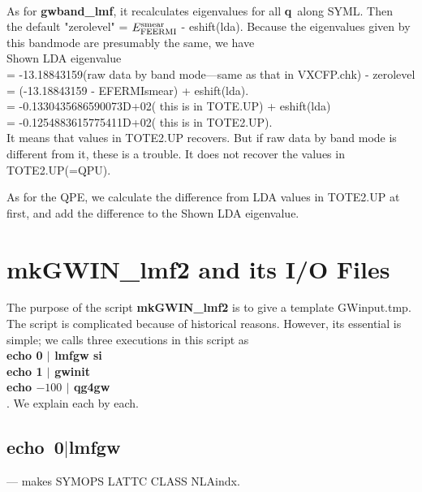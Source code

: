 \documentclass[a4paper,10pt,epsf,fleqn]{article}
\newcommand{\ssxx}[2]{\subsection{\bf #1\index{\bf #2}}}
\newcommand{\infiles}{\noindent\fbox{Input files}}
\newcommand{\bfq}{{\bf q}}
\newcommand{\exe}[1]{{\bf #1}}
\newcommand{\io}[1]{{\sf  #1}}
\begin{document}
{\begin{enumerate}
\end{enumerate}

~\\

As for {\bf gwband\_lmf}, it recalculates eigenvalues for all \bfq \ along SYML.
Then\\ the default "zerolevel" = $E_{\rm FEERMI}^{\rm smear}$ - eshift(lda). 
Because the eigenvalues given by this bandmode are presumably the same, we have\\
Shown LDA eigenvalue\\
 =  -13.18843159(raw data by band mode---same as that in VXCFP.chk) - zerolevel\\
 = (-13.18843159 - EFERMIsmear) + eshift(lda).\\
 =  -0.1330435686590073D+02( this is in TOTE.UP) + eshift(lda)\\
 =  -0.1254883615775411D+02( this is in TOTE2.UP).\\

It means that values in \io{TOTE2.UP} recovers.
But if raw data by band mode is different from it, these is a trouble. 
It does not recover the values in \io{TOTE2.UP}(=\io{QPU}).

As for the QPE, we calculate the difference from LDA values
in TOTE2.UP at first, and add the difference to the Shown LDA eigenvalue.







\newpage
\section{{\bf mkGWIN\_lmf2} and its I/O Files}

The purpose of the script {\bf mkGWIN\_lmf2} is to give a template \io{GWinput.tmp}.
The script is complicated because of historical reasons. 
However, its essential is simple;
we calls three executions in this script as\\
\exe{echo 0 $|$ lmfgw si}\\
\exe{echo 1 $|$ gwinit}\\
\exe{echo $-100$ $|$ qg4gw}\\
. We explain each by each.

\ssxx{echo~0$|$lmfgw}{lmfgw00} \noindent --- makes SYMOPS LATTC CLASS NLAindx.

\label{lmfgw}
\infiles

}
\end{document}

